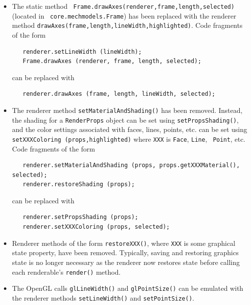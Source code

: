 \documentclass{article}
\begin{document}
\begin{itemize}
\item The static method {\tt
Frame.drawAxes(renderer,frame,length,selected)} (located in {\tt
core.mechmodels.Frame}) has been replaced with the renderer method
{\tt drawAxes(frame,length,lineWidth,highlighted)}.  Code fragments of
the form
\begin{verbatim}
   renderer.setLineWidth (lineWidth);
   Frame.drawAxes (renderer, frame, length, selected);
\end{verbatim}
can be replaced with
\begin{verbatim}
   renderer.drawAxes (frame, length, lineWidth, selected);
\end{verbatim}

\item The renderer method {\tt setMaterialAndShading()} has been
removed. Instead, the shading for a {\tt RenderProps} object can be
set using {\tt setPropsShading()}, and the color settings associated
with faces, lines, points, etc. can be set using {\tt setXXXColoring
(props,highlighted)} where {\tt XXX} is {\tt Face}, {\tt Line}, {\tt
Point}, etc.
Code fragments of the form
\begin{verbatim}
   renderer.setMaterialAndShading (props, props.getXXXMaterial(), selected);
   renderer.restoreShading (props);
\end{verbatim}
can be replaced with
\begin{verbatim}
   renderer.setPropsShading (props);
   renderer.setXXXColoring (props, selected);
\end{verbatim}

\item Renderer methods of the form {\tt restoreXXX()}, where {\tt XXX}
is some graphical state property, have been removed. Typically, saving
and restoring graphics state is no longer necessary as the renderer
now restores state before calling each renderable's {\tt render()}
method.

\item The OpenGL calls {\tt glLineWidth()} and {\tt glPointSize()}
can be emulated with the renderer methods {\tt setLineWidth()}
and {\tt setPointSize()}.


\end{itemize}
\end{document}
